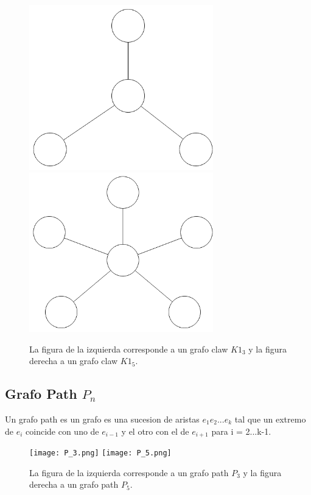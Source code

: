 \begin{figure}[H]
\includegraphics[width=80mm]{K1_3.png}
\includegraphics[width=80mm]{K1_5.png}
\caption{La figura de la izquierda corresponde a un grafo claw $K1_3$ y la figura derecha a un grafo claw $K1_5$.}
\label{overflow}
\end{figure}

\subsection{Grafo Path $P_n$}
Un grafo path es un grafo es una sucesion de aristas $e_1e_2$...$e_k$ tal que un extremo de $e_i$ coincide con uno de $e_{i-1}$ y el otro con el de $e_{i+1}$ para i = 2...k-1.

\begin{figure}[H]
\texttt{[image: P\_3.png]}
\texttt{[image: P\_5.png]}
\caption{La figura de la izquierda corresponde a un grafo path $P_3$ y la figura derecha a un grafo path $P_5$.}
\label{overflow}
\end{figure}